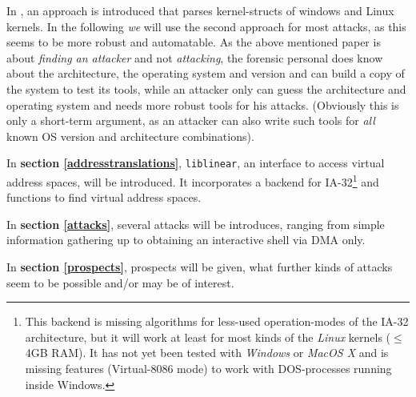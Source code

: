 In \cite{finding_digital_evidence_in_physical_memory:2006}, an approach is
introduced that parses kernel-structs of windows and Linux kernels. In the
following \emph{we} will use the second approach for most attacks, as this seems
to be more robust and automatable. As the above mentioned paper is about
\emph{finding an attacker} and not \emph{attacking}, the forensic personal does
know about the architecture, the operating system and version and can build a
copy of the system to test its tools, while an attacker only can guess the
architecture and operating system and needs more robust tools for his attacks.
(Obviously this is only a short-term argument, as an attacker can also write
such tools for \emph{all} known OS version and architecture combinations).

In \textbf{section \ref{addresstranslations}}, \texttt{liblinear}, an interface
to access virtual address spaces, will be introduced. It incorporates a backend
for IA-32\footnote{This backend is missing algorithms for less-used
operation-modes of the IA-32 architecture, but it will work at least for most
kinds of the \emph{Linux} kernels ($\leq$ 4GB RAM). It has not yet been tested
with \emph{Windows} or \emph{MacOS X} and is missing features (Virtual-8086
mode) to work with DOS-processes running inside Windows.} and functions to find
virtual address spaces.



In \textbf{section \ref{attacks}}, several attacks will be introduces, ranging
from simple information gathering up to obtaining an interactive shell via DMA
only. 



In \textbf{section \ref{prospects}}, prospects will be given, what further kinds
of attacks seem to be possible and/or may be of interest.

